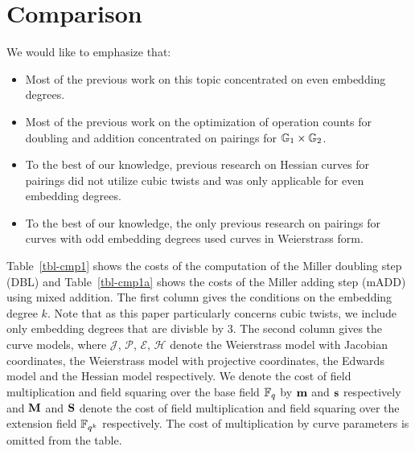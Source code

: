 \section{Comparison}
\label{sec:cmp}

We would like to emphasize that:
\begin{itemize}
\item	Most of the previous work on this topic concentrated on even embedding degrees.
\item   Most of the previous work on the optimization of operation counts for doubling and addition concentrated on pairings for $\mathbb{G}_{1} \times \mathbb{G}_{2}$.
\item   To the best of our knowledge, previous research on Hessian curves for pairings did not utilize cubic twists and was only applicable for even embedding degrees.
\item   To the best of our knowledge, the only previous research on pairings for curves with odd embedding degrees used curves in Weierstrass form.
\end{itemize}

Table~\ref{tbl-cmp1} shows the costs of the computation of the Miller doubling step (DBL) and Table~\ref{tbl-cmp1a} shows the costs of the Miller adding step (mADD) using mixed addition.
The first column gives the conditions on the embedding degree $k$.
Note that as this paper particularly concerns cubic twists, we include only embedding degrees that are divisble by 3.
The second column gives the curve models, where 
$\mathcal{J}$, $\mathcal{P}$, $\mathcal{E}$, $\mathcal{H}$ denote the
Weierstrass model with Jacobian coordinates, the
Weierstrass model with projective coordinates,
the Edwards model and the
Hessian model respectively.
We denote the cost of field multiplication and field squaring over the base field $\mathbb{F}_{q}$ by $\textbf{m}$ and $\textbf{s}$ respectively and $\textbf{M}$ and $\textbf{S}$ denote the cost of field multiplication and field squaring over the extension field $\mathbb{F}_{q^k}$ respectively.
The cost of multiplication by curve parameters is omitted from the table.


